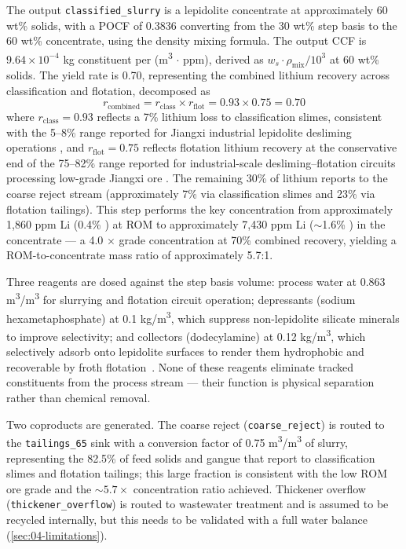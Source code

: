 The output \texttt{classified\_slurry} is a lepidolite concentrate at approximately 60 wt\% solids, with a POCF of 0.3836 converting from the 30 wt\% step basis to the 60 wt\% concentrate, using the density mixing formula. The output CCF is $9.64 \times 10^{-4}$ kg constituent per (\si{m^3} $\cdot$ ppm), derived as $w_s \cdot \rho_{\text{mix}}/10^3$ at 60 wt\% solids. The yield rate is 0.70, representing the combined lithium recovery across classification and flotation, decomposed as \[r_{\text{combined}} = r_{\text{class}} \times r_{\text{flot}} = 0.93 \times 0.75 = 0.70\] where $r_{\text{class}} = 0.93$ reflects a 7\% lithium loss to classification slimes, consistent with the 5--8\% range reported for Jiangxi industrial lepidolite desliming operations \cite{zhangInnovativeRecoveryLepidolite2025}, and $r_{\text{flot}} = 0.75$ reflects flotation lithium recovery at the conservative end of the 75--82\% range reported for industrial-scale desliming--flotation circuits processing low-grade Jiangxi ore \cite{jiaoKeyTechnologiesDevelopment2024, zhangInnovativeRecoveryLepidolite2025}. The remaining 30\% of lithium reports to the coarse reject stream (approximately 7\% via classification slimes and 23\% via flotation tailings). This step performs the key concentration from approximately 1,860 ppm Li (0.4\% ) at ROM to approximately 7,430 ppm Li ($\sim$1.6\% ) in the concentrate --- a 4.0
$\times$ grade concentration at 70\% combined recovery, yielding a ROM-to-concentrate mass ratio of approximately 5.7:1.

Three reagents are dosed against the step basis volume: process water at 0.863 m\textsuperscript{3}/m\textsuperscript{3} for slurrying and flotation circuit operation; depressants (sodium hexametaphosphate) at 0.1 kg/m\textsuperscript{3}, which suppress non-lepidolite silicate minerals to improve selectivity; and collectors (dodecylamine) at 0.12 kg/m\textsuperscript{3}, which selectively adsorb onto lepidolite surfaces to render them hydrophobic and recoverable by froth flotation~\cite{jiaoKeyTechnologiesDevelopment2024}. None of these reagents eliminate tracked constituents from the process stream --- their function is physical separation rather than chemical removal.

Two coproducts are generated. The coarse reject (\texttt{coarse\_reject}) is routed to the \texttt{tailings\_65} sink with a conversion factor of 0.75 \si{m^3/m^3} of slurry, representing the 82.5\% of feed solids and gangue that report to classification slimes and flotation tailings; this large fraction is consistent with the low ROM ore grade and the $\sim 5.7 \times$ concentration ratio achieved. Thickener overflow (\texttt{thickener\_overflow}) is routed to wastewater treatment and is assumed to be recycled internally, but this needs to be validated with a full water balance (\ref{sec:04-limitations}). 

